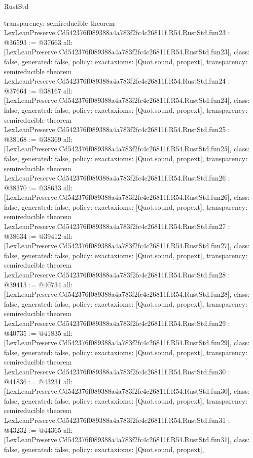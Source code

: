 \begin{lexlean}{RustStd}
\begin{coremodule}
{  transparency: semireducible
}
theorem LexLeanPreserve.Cd542376f089388a4a783f2fc4c26811f.R54.RustStd.fun23 : @36593 := @37663 {
  all: [LexLeanPreserve.Cd542376f089388a4a783f2fc4c26811f.R54.RustStd.fun23],
  class: false,
  generated: false,
  policy: exact{axioms: [Quot.sound, propext]},
  transparency: semireducible
}
theorem LexLeanPreserve.Cd542376f089388a4a783f2fc4c26811f.R54.RustStd.fun24 : @37664 := @38167 {
  all: [LexLeanPreserve.Cd542376f089388a4a783f2fc4c26811f.R54.RustStd.fun24],
  class: false,
  generated: false,
  policy: exact{axioms: [Quot.sound, propext]},
  transparency: semireducible
}
theorem LexLeanPreserve.Cd542376f089388a4a783f2fc4c26811f.R54.RustStd.fun25 : @38168 := @38369 {
  all: [LexLeanPreserve.Cd542376f089388a4a783f2fc4c26811f.R54.RustStd.fun25],
  class: false,
  generated: false,
  policy: exact{axioms: [Quot.sound, propext]},
  transparency: semireducible
}
theorem LexLeanPreserve.Cd542376f089388a4a783f2fc4c26811f.R54.RustStd.fun26 : @38370 := @38633 {
  all: [LexLeanPreserve.Cd542376f089388a4a783f2fc4c26811f.R54.RustStd.fun26],
  class: false,
  generated: false,
  policy: exact{axioms: [Quot.sound, propext]},
  transparency: semireducible
}
theorem LexLeanPreserve.Cd542376f089388a4a783f2fc4c26811f.R54.RustStd.fun27 : @38634 := @39412 {
  all: [LexLeanPreserve.Cd542376f089388a4a783f2fc4c26811f.R54.RustStd.fun27],
  class: false,
  generated: false,
  policy: exact{axioms: [Quot.sound, propext]},
  transparency: semireducible
}
theorem LexLeanPreserve.Cd542376f089388a4a783f2fc4c26811f.R54.RustStd.fun28 : @39413 := @40734 {
  all: [LexLeanPreserve.Cd542376f089388a4a783f2fc4c26811f.R54.RustStd.fun28],
  class: false,
  generated: false,
  policy: exact{axioms: [Quot.sound, propext]},
  transparency: semireducible
}
theorem LexLeanPreserve.Cd542376f089388a4a783f2fc4c26811f.R54.RustStd.fun29 : @40735 := @41835 {
  all: [LexLeanPreserve.Cd542376f089388a4a783f2fc4c26811f.R54.RustStd.fun29],
  class: false,
  generated: false,
  policy: exact{axioms: [Quot.sound, propext]},
  transparency: semireducible
}
theorem LexLeanPreserve.Cd542376f089388a4a783f2fc4c26811f.R54.RustStd.fun30 : @41836 := @43231 {
  all: [LexLeanPreserve.Cd542376f089388a4a783f2fc4c26811f.R54.RustStd.fun30],
  class: false,
  generated: false,
  policy: exact{axioms: [Quot.sound, propext]},
  transparency: semireducible
}
theorem LexLeanPreserve.Cd542376f089388a4a783f2fc4c26811f.R54.RustStd.fun31 : @43232 := @44365 {
  all: [LexLeanPreserve.Cd542376f089388a4a783f2fc4c26811f.R54.RustStd.fun31],
  class: false,
  generated: false,
  policy: exact{axioms: [Quot.sound, propext]},
}
\end{coremodule}
\end{lexlean}
